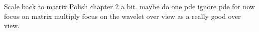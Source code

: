 Scale back to matrix 
Polish chapter 2 a bit.  
maybe do one pde
	ignore pde for now
	focus on matrix multiply
	focus on the wavelet over view as a really good over view.